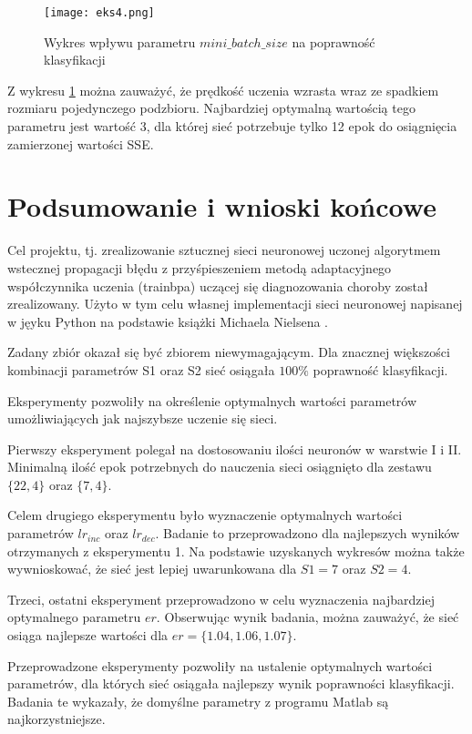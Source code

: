 \documentclass[12pt,twoside]{article}
\begin{document}
\begin{figure}[H]
	\centering
	\texttt{[image: eks4.png]}
	\caption{Wykres wpływu parametru $mini\_batch\_size$ na poprawność klasyfikacji}
	\label{ryseks4}
\end{figure}

Z wykresu \ref{ryseks4} można zauważyć, że prędkość uczenia wzrasta wraz ze spadkiem rozmiaru pojedynczego podzbioru. Najbardziej optymalną wartością tego parametru jest wartość 3, dla której sieć potrzebuje tylko 12 epok do osiągnięcia zamierzonej wartości SSE. 


\clearpage
\section{Podsumowanie i wnioski końcowe}

Cel projektu, tj. zrealizowanie sztucznej sieci neuronowej uczonej algorytmem wstecznej propagacji błędu z przyśpieszeniem metodą adaptacyjnego współczynnika uczenia (trainbpa) uczącej się diagnozowania choroby został zrealizowany. Użyto w tym celu własnej implementacji sieci neuronowej napisanej w jęyku Python na podstawie książki Michaela Nielsena \cite{nielsen}. 

Zadany zbiór okazał się być zbiorem niewymagającym. Dla znacznej większości kombinacji parametrów S1 oraz S2 sieć osiągała $100\%$ poprawność klasyfikacji. 

Eksperymenty pozwoliły na określenie optymalnych wartości parametrów umożliwiających jak najszybsze uczenie się sieci. 

Pierwszy eksperyment polegał na dostosowaniu ilości neuronów w warstwie I i II. Minimalną ilość epok potrzebnych do nauczenia sieci osiągnięto dla zestawu $\{22,4\}$ oraz $\{7,4\}$. 

Celem drugiego eksperymentu było wyznaczenie optymalnych wartości parametrów $lr_{inc}$ oraz $lr_{dec}$. Badanie to przeprowadzono dla najlepszych wyników otrzymanych z eksperymentu 1. Na podstawie uzyskanych wykresów można także wywnioskować, że sieć jest lepiej uwarunkowana dla $S1 = 7$ oraz $S2 = 4$.

Trzeci, ostatni eksperyment przeprowadzono w celu wyznaczenia najbardziej optymalnego parametru $er$. Obserwując wynik badania, można zauważyć, że sieć osiąga najlepsze wartości dla $er = \{1.04, 1.06, 1.07\}$. 

Przeprowadzone eksperymenty pozwoliły na ustalenie optymalnych wartości parametrów, dla których sieć osiągała najlepszy wynik poprawności klasyfikacji. Badania te wykazały, że domyślne parametry z programu Matlab są najkorzystniejsze. 
\end{document}
